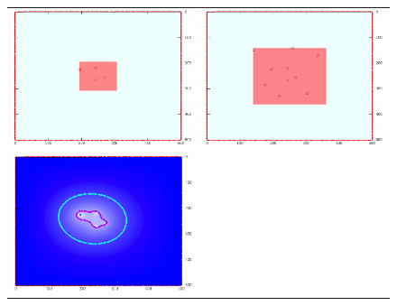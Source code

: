 \begin{refsection}
\newlength\breite
\setlength\breite{8cm}
\begin{figure}
\centering
\begin{tabular}{cc}
\includegraphics[width=\breite]{green/images/resultate/grfl/step0057.png}
& \includegraphics[width=\breite]{green/images/resultate/grfl/step0111.png}\vspace{1cm}\\
\includegraphics[width=\breite]{green/images/resultate/cp/step0057.png}

\end{tabular}
\end{figure}
\end{refsection}
